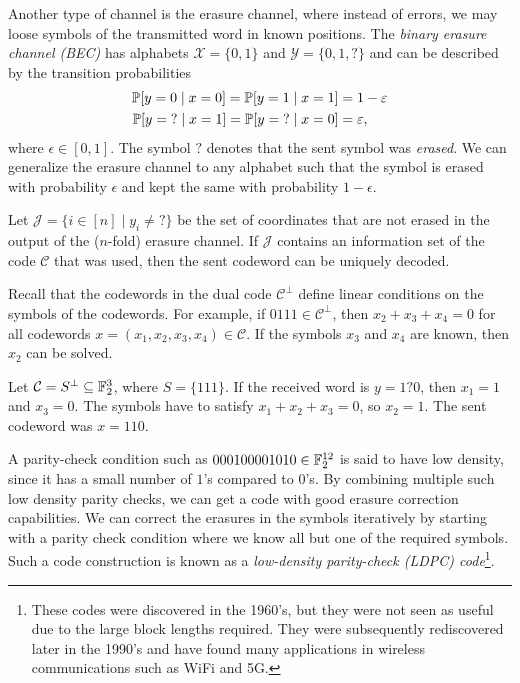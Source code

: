 \documentclass[../main.tex]{subfiles}
\begin{document}
Another type of channel is the erasure channel, where instead of errors, we may loose symbols of the transmitted word in known positions. The \emph{binary erasure channel (BEC)} has alphabets $\mathcal{X} = \{0, 1\}$ and $\mathcal{Y} = \{0, 1, ?\}$ and can be described by the transition probabilities
\begin{align*}
    \P[y = 0 \mid x = 0] = \P[y = 1 \mid x = 1] &= 1 - \epsilon \\
    \P[y = {?} \mid x = 1] = \P[y = {?} \mid x = 0] &= \epsilon,
\end{align*}
where $\epsilon \in [0, 1]$. The symbol $?$ denotes that the sent symbol was \emph{erased}. We can generalize the erasure channel to any alphabet such that the symbol is erased with probability $\epsilon$ and kept the same with probability $1 - \epsilon$.

Let $\mathcal{J} = \{i \in [n] \mid y_i \neq {?} \}$ be the set of coordinates that are not erased in the output of the ($n$-fold) erasure channel. If $\mathcal{J}$ contains an information set of the code $\mathcal{C}$ that was used, then the sent codeword can be uniquely decoded.

Recall that the codewords in the dual code $\mathcal{C}^\perp$ define linear conditions on the symbols of the codewords. For example, if $0111 \in \mathcal{C}^\perp$, then $x_2 + x_3 + x_4 = 0$ for all codewords $x = (x_1, x_2, x_3, x_4) \in \mathcal{C}$. If the symbols $x_3$ and $x_4$ are known, then $x_2$ can be solved.

\begin{example}
Let $\mathcal{C} = S^\perp \subseteq \F_2^3$, where $S = \{111\}$. If the received word is $y = 1?0$, then $x_1 = 1$ and $x_3 = 0$. The symbols have to satisfy $x_1 + x_2 + x_3 = 0$, so $x_2 = 1$. The sent codeword was $x = 110$.
\end{example}

\begin{example}
A parity-check condition such as $000100001010 \in \F_2^{12}$ is said to have low density, since it has a small number of $1$'s compared to $0$'s. By combining multiple such low density parity checks, we can get a code with good erasure correction capabilities. We can correct the erasures in the symbols iteratively by starting with a parity check condition where we know all but one of the required symbols. Such a code construction is known as a \emph{low-density parity-check (LDPC) code}\footnote{These codes were discovered in the 1960's, but they were not seen as useful due to the large block lengths required. They were subsequently rediscovered later in the 1990's and have found many applications in wireless communications such as WiFi and 5G.}.
\end{example}
\end{document}
